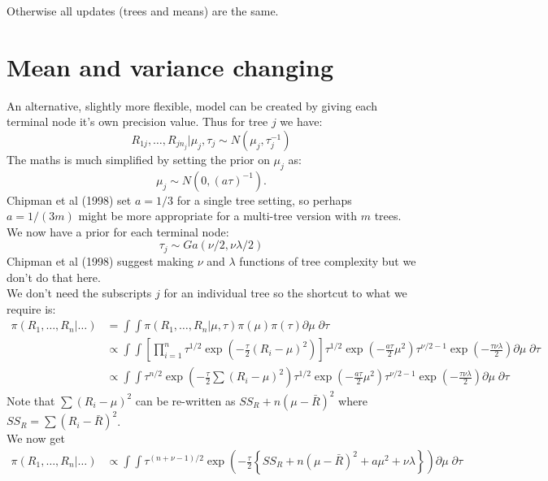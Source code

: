 \documentclass{article}
\begin{document}
Otherwise all updates (trees and means) are the same.

\section*{Mean and variance changing}

An alternative, slightly more flexible, model can be created by giving each terminal node it's own precision value. Thus for tree $j$ we have:
$$ R_{1j}, \ldots, R_{jn_j} | \mu_j, \tau_j \sim N(\mu_j, \tau_j^{-1})$$
The maths is much simplified by setting the prior on $\mu_j$ as:
$$\mu_j \sim N(0, (a \tau)^{-1}).$$
Chipman et al (1998) set $a = 1/3$ for a single tree setting, so perhaps $a = 1/(3m)$ might be more appropriate for a multi-tree version with $m$ trees.\\

We now have a prior for each terminal node:
$$\tau_j \sim Ga(\nu/2, \nu \lambda / 2)$$
Chipman et al (1998) suggest making $\nu$ and $\lambda$ functions of tree complexity but we don't do that here.\\

We don't need the subscripts $j$ for an individual tree so the shortcut to what we require is:
\begin{align*}
\pi(R_1, \ldots, R_n| \ldots ) &= \int \int \pi(R_1, \ldots, R_n| \mu, \tau) \pi(\mu) \pi(\tau) \partial \mu \; \partial \tau \\
&\propto \int \int \left[ \prod_{i=1}^n \tau^{1/2} \exp \left(-\frac{\tau}{2} (R_i - \mu)^2 \right) \right]\tau^{1/2} \exp \left(-\frac{a \tau}{2} \mu^2 \right) \tau^{\nu/2 - 1} \exp \left( - \frac{\tau \nu \lambda} {2} \right) \partial \mu \; \partial \tau \\
&\propto \int \int \tau^{n/2} \exp \left(-\frac{\tau}{2} \sum (R_i - \mu)^2 \right) \tau^{1/2} \exp \left(-\frac{a \tau}{2} \mu^2 \right) \tau^{\nu/2 - 1} \exp \left( - \frac{\tau \nu \lambda} {2} \right) \partial \mu \; \partial \tau 
\end{align*}
Note that $\sum (R_i - \mu)^2$ can be re-written as $SS_{R} + n(\mu - \bar{R})^2$ where $SS_R = \sum (R_i - \bar{R})^2$.\\

We now get
\begin{align*}
\pi(R_1, \ldots, R_n| \ldots ) &\propto \int \int  \tau^{(n+\nu - 1)/2} \exp \left(-\frac{\tau}{2} \left\{ SS_{R} + n(\mu - \bar{R})^2  + a \mu^2 + \nu \lambda \right\} \right) \partial \mu \; \partial \tau
\end{align*}
\end{document}
